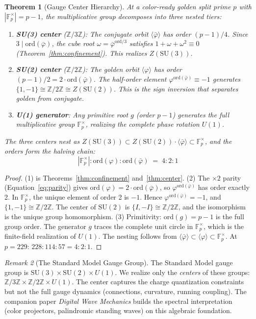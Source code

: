 \documentclass[12pt,oneside]{article}
\theoremstyle{principia}
\newtheorem{theorem}{Theorem}[section]
\theoremstyle{definition}
\theoremstyle{remark}
\newtheorem{remark}[theorem]{Remark}
\providecommand{\ZZ}{\mathbb{Z}}
\providecommand{\FF}{\mathbb{F}}
\providecommand{\vp}{\varphi}
\providecommand{\vpbar}{\bar{\varphi}}
\begin{document}
\begin{theorem}[Gauge Center Hierarchy]\label{thm:gauge}
At a color-ready golden split prime $p$ with $|{\FF_p^\times}| = p - 1$, the multiplicative group decomposes into three nested tiers:
\begin{enumerate}
\item \textbf{SU(3) center} ($\ZZ/3\ZZ$): The conjugate orbit $\langle\vpbar\rangle$ has order $(p-1)/4$. Since $3 \mid \mathrm{ord}(\vpbar)$, the cube root $\omega = \vpbar^{\mathrm{ord}/3}$ satisfies $1 + \omega + \omega^2 \equiv 0$ (Theorem~\ref{thm:confinement}). This realizes $Z(\mathrm{SU}(3))$.
\item \textbf{SU(2) center} ($\ZZ/2\ZZ$): The golden orbit $\langle\vp\rangle$ has order $(p-1)/2 = 2 \cdot \mathrm{ord}(\vpbar)$. The half-order element $\vp^{\mathrm{ord}(\vpbar)} \equiv -1$ generates $\{1, -1\} \cong \ZZ/2\ZZ \cong Z(\mathrm{SU}(2))$. This is the sign inversion that separates golden from conjugate.
\item \textbf{U(1) generator}: Any primitive root $g$ (order $p - 1$) generates the full multiplicative group $\FF_p^\times$, realizing the complete phase rotation $U(1)$.
\end{enumerate}
The three centers nest as $Z(\mathrm{SU}(3)) \subset Z(\mathrm{SU}(2)) \cdot \langle\vpbar\rangle \subset \FF_p^\times$, and the orders form the halving chain:
$$|{\FF_p^\times}| : \mathrm{ord}(\vp) : \mathrm{ord}(\vpbar) \;=\; 4 : 2 : 1$$
\end{theorem}

\begin{proof}
(1) is Theorems~\ref{thm:confinement} and~\ref{thm:center}. (2) The $\times 2$ parity (Equation~\ref{eq:parity}) gives $\mathrm{ord}(\vp) = 2 \cdot \mathrm{ord}(\vpbar)$, so $\vp^{\mathrm{ord}(\vpbar)}$ has order exactly 2. In $\FF_p^\times$, the unique element of order 2 is $-1$. Hence $\vp^{\mathrm{ord}(\vpbar)} = -1$, and $\{1, -1\} \cong \ZZ/2\ZZ$. The center of $\mathrm{SU}(2)$ is $\{I, -I\} \cong \ZZ/2\ZZ$, and the isomorphism is the unique group homomorphism. (3) Primitivity: $\mathrm{ord}(g) = p - 1$ is the full group order. The generator $g$ traces the complete unit circle in $\FF_p^\times$, which is the finite-field realization of $U(1)$. The nesting follows from $\langle\vpbar\rangle \subset \langle\vp\rangle \subset \FF_p^\times$. At $p = 229$: $228 : 114 : 57 = 4 : 2 : 1$. \qedhere
\end{proof}

\begin{remark}[The Standard Model Gauge Group]
The Standard Model gauge group is $\mathrm{SU}(3) \times \mathrm{SU}(2) \times U(1)$. We realize only the \emph{centers} of these groups: $\ZZ/3\ZZ \times \ZZ/2\ZZ \times U(1)$. The center captures the charge quantization constraints but not the full gauge dynamics (connections, curvature, running coupling). The companion paper \emph{Digital Wave Mechanics} builds the spectral interpretation (color projectors, palindromic standing waves) on this algebraic foundation.
\end{remark}
\end{document}
